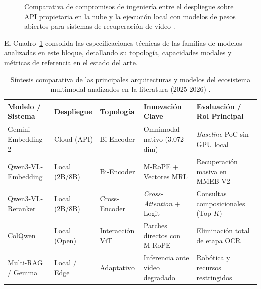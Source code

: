 \begin{figure}[htbp]
\caption{Comparativa de compromisos de ingeniería entre el despliegue sobre API propietaria en la nube y la ejecución local con modelos de pesos abiertos para sistemas de recuperación de vídeo \cite{gemini_emb2_docs, qwen3_vl_emb2026}.} %
\label{fig:tradeoff_cloud_local_tfm}
\end{figure}

El Cuadro~\ref{tab:ecosistema_modelos_2026} consolida las especificaciones técnicas de las familias de modelos analizadas en este bloque, detallando su topología, capacidades modales y métricas de referencia en el estado del arte. %

\begin{table}[htbp]
\centering
\small
\setlength{\tabcolsep}{4.5pt}
\caption{Síntesis comparativa de las principales arquitecturas y modelos del ecosistema multimodal analizados en la literatura (2025-2026) \cite{gemini_emb2_docs, qwen3_vl_emb2026, multi_rag2025, prajwal2025multimodal}.} %
\label{tab:ecosistema_modelos_2026}
\begin{tabularx}{\linewidth}{>{\raggedright\arraybackslash}p{3.2cm} >{\raggedright\arraybackslash}p{2.2cm} >{\raggedright\arraybackslash}p{2.4cm} >{\raggedright\arraybackslash}X >{\raggedright\arraybackslash}X}
\toprule
\textbf{Modelo / Sistema} & \textbf{Despliegue} & \textbf{Topología} & \textbf{Innovación Clave} & \textbf{Evaluación / Rol Principal} \\
\midrule
Gemini Embedding 2 & Cloud (API) & Bi-Encoder & Omnimodal nativo (3.072 dim) & \textit{Baseline} PoC sin GPU local \\
Qwen3-VL-Embedding & Local (2B/8B) & Bi-Encoder & M-RoPE + Vectores MRL & Recuperación masiva en MMEB-V2 \\
Qwen3-VL-Reranker & Local (2B/8B) & Cross-Encoder & \textit{Cross-Attention} + Logit & Consultas composicionales (Top-$K$) \\
ColQwen & Local (Open) & Interacción ViT & Parches directos con M-RoPE & Eliminación total de etapa OCR \\
Multi-RAG / Gemma & Local / Edge & Adaptativo & Inferencia ante vídeo degradado & Robótica y recursos restringidos \\
\bottomrule
\end{tabularx}
\end{table}

